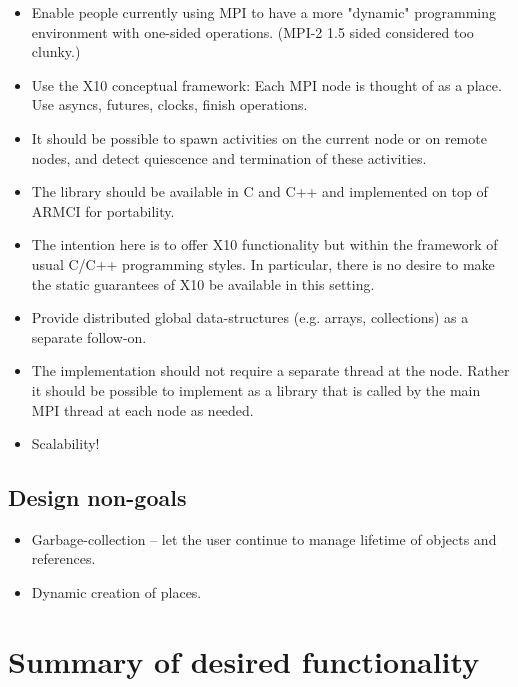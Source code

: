 \documentclass{article}
\begin{document}
\begin{itemize}

\item Enable people currently using MPI to have a more "dynamic"
  programming environment with one-sided operations. (MPI-2 1.5 sided
  considered too clunky.)

\item Use the X10 conceptual framework: Each MPI node is thought of as a
  place. Use asyncs, futures, clocks, finish operations.

\item It should be possible to spawn activities on the current node or on
  remote nodes, and detect quiescence and termination of these
  activities.

\item The library should be available in C and C++ and implemented on top
  of ARMCI for portability.

\item The intention here is to offer X10 functionality but within the
  framework of usual C/C++ programming styles. In particular, there is
  no desire to make the static guarantees of X10 be available in this
  setting.

\item Provide distributed global data-structures (e.g. arrays,
  collections) as a separate follow-on.

\item The implementation should not require a separate thread at the
  node. Rather it should be possible to implement as a library that
  is called by the main MPI thread at each node as needed.

\item Scalability!

\end{itemize}

\subsection{Design non-goals}

\begin{itemize}
\item Garbage-collection -- let the user continue to manage lifetime of
  objects and references.

\item Dynamic creation of places.
\end{itemize}

\section{Summary of desired functionality}
\end{document}
